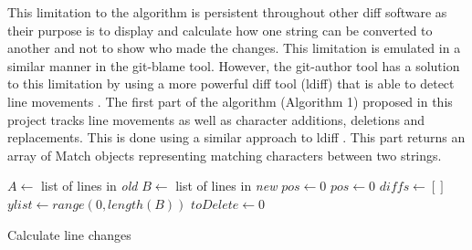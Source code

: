 This limitation to the algorithm is persistent throughout other diff software as their purpose is to display and calculate how one string can be converted to another and not to show who made the changes. This limitation is emulated in a similar manner in the git-blame tool. However, the git-author tool has a solution to this limitation by using a more powerful diff tool (ldiff) that is able to detect line movements \citep{6676896}. The first part of the algorithm (Algorithm 1) proposed in this project tracks line movements as well as character additions, deletions and replacements. This is done using a similar approach to ldiff \citep{5070564}. This part returns an array of Match objects representing matching characters between two strings.

\begin{algorithm}[htp]
\SetAlgoLined\DontPrintSemicolon
{}
 {
  $A \longleftarrow$ list of lines in \textit{old}\;
  $B \longleftarrow$ list of lines in \textit{new}\;
  $pos \longleftarrow 0$\;
  $\textit{pos} \longleftarrow 0$\;
  $diffs \longleftarrow []$\;
  $ylist \longleftarrow range(0, length(B))$\;
  $toDelete \longleftarrow 0$\;
}
\caption{Calculate line changes}
\end{algorithm}
